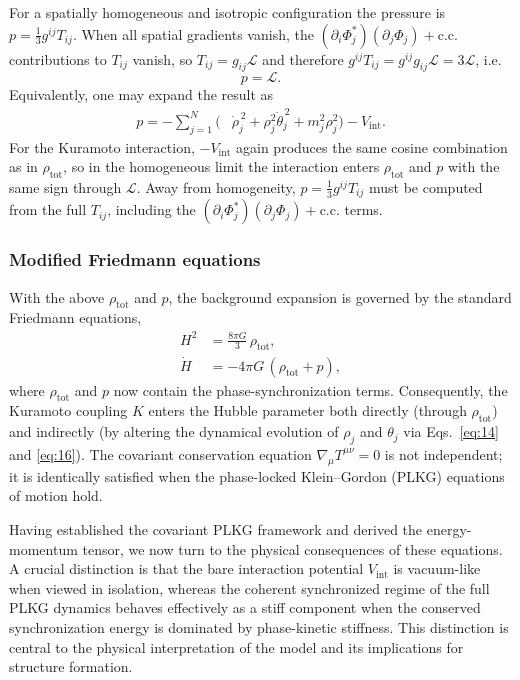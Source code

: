 For a spatially homogeneous and isotropic configuration the pressure is $p=\frac{1}{3}g^{ij}T_{ij}$. When all spatial gradients vanish, the $(\partial_i\Phi_j^*)(\partial_j\Phi_j)+\mathrm{c.c.}$ contributions to $T_{ij}$ vanish, so $T_{ij}=g_{ij}\mathcal{L}$ and therefore $g^{ij}T_{ij}=g^{ij}g_{ij}\mathcal{L}=3\mathcal{L}$, i.e.
\begin{equation}
    p=\mathcal{L}.
\end{equation}
Equivalently, one may expand the result as
\begin{equation}
    {
    \begin{aligned}
        p = -\sum_{j=1}^N \Big( &\dot{\rho}_j^{\,2}
        + \rho_j^2\dot{\theta}_j^{\,2}
        + m_j^2\rho_j^2 \Big)
        - V_{\mathrm{int}} .
    \end{aligned}
    }
\end{equation}
For the Kuramoto interaction, $-V_{\mathrm{int}}$ again produces the same cosine combination as in $\rho_{\mathrm{tot}}$, so in the homogeneous limit the interaction enters $\rho_{\mathrm{tot}}$ and $p$ with the same sign through $\mathcal{L}$. Away from homogeneity, $p=\frac{1}{3}g^{ij}T_{ij}$ must be computed from the full $T_{ij}$, including the $(\partial_i\Phi_j^*)(\partial_j\Phi_j)+\mathrm{c.c.}$ terms.

\subsubsection*{Modified Friedmann equations}

With the above $\rho_{\mathrm{tot}}$ and $p$, the background expansion is governed by the standard Friedmann equations,
\begin{align}
    H^2 &= \frac{8\pi G}{3}\,\rho_{\mathrm{tot}} ,\\[4pt]
    \dot{H} &= -4\pi G\,(\rho_{\mathrm{tot}} + p) ,
\end{align}
where $\rho_{\mathrm{tot}}$ and $p$ now contain the phase-synchronization terms. Consequently, the Kuramoto coupling $K$ enters the Hubble parameter both directly (through $\rho_{\mathrm{tot}}$) and indirectly (by altering the dynamical evolution of $\rho_j$ and $\theta_j$ via Eqs.~\eqref{eq:14} and \eqref{eq:16}). The covariant conservation equation $\nabla_\mu T^{\mu\nu}=0$ is not independent; it is identically satisfied when the phase-locked Klein--Gordon (PLKG) equations of motion hold.

Having established the covariant PLKG framework and derived the energy-momentum tensor, we now turn to the physical consequences of these equations. A crucial distinction is that the bare interaction potential $V_{\text{int}}$ is vacuum-like when viewed in isolation, whereas the coherent synchronized regime of the full PLKG dynamics behaves effectively as a stiff component when the conserved synchronization energy is dominated by phase-kinetic stiffness. This distinction is central to the physical interpretation of the model and its implications for structure formation.

